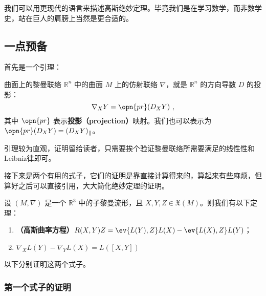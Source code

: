 
\begin{issues}
\issueDraft
{}
\end{issues}



我们可以用更现代的语言来描述高斯绝妙定理。毕竟我们是在学习数学，而非数学史，站在巨人的肩膀上当然是更合适的。

\subsection{一点预备}

首先是一个引理：

\begin{lemma}{曲面上的黎曼联络}\label{lem_Egreg_1}
$\mathbb{R}^n$ 中的曲面 $M$ 上的仿射联络 $\nabla$，就是 $\mathbb{R}^n$ 的方向导数 $D$ 的投影：
\begin{equation}
\nabla_XY=\opn{pr}(D_XY)~,
\end{equation}
其中 $\opn{pr}$ 表示\textbf{投影（projection）}映射。我们也可以表示为 $\opn{pr}(D_XY)=(D_XY)_\parallel$。
\end{lemma}

引理较为直观，证明留给读者，只需要挨个验证黎曼联络所需要满足的线性性和Leibniz律即可。

接下来是两个有用的式子，它们的证明是靠直接计算得来的，算起来有些麻烦，但算好之后可以直接引用，大大简化绝妙定理的证明。

\begin{theorem}{}\label{the_Egreg_1}
设 $(M, \nabla)$ 是一个 $\mathbb{R}^3$ 中的子黎曼流形，且 $X, Y, Z\in\mathfrak{X}(M)$。则我们有以下定理：
\begin{enumerate}
\item \textbf{（高斯曲率方程）}$R(X, Y)Z=\ev{L(Y), Z}L(X)-\ev{L(X), Z}L(Y)$；
\item $\nabla_XL(Y)-\nabla_YL(X)=L([X, Y])$
\end{enumerate}
\end{theorem}

以下分别证明这两个式子。

\subsubsection{第一个式子的证明}

